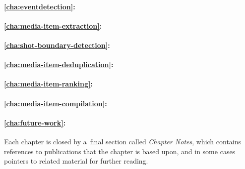\paragraph{\autoref{cha:eventdetection}:}
\paragraph{\autoref{cha:media-item-extraction}:}
\paragraph{\autoref{cha:shot-boundary-detection}:}
\paragraph{\autoref{cha:media-item-deduplication}:}
\paragraph{\autoref{cha:media-item-ranking}:}
\paragraph{\autoref{cha:media-item-compilation}:}
\paragraph{\autoref{cha:future-work}:}

Each chapter is closed by a~final section called
\emph{Chapter Notes}, which contains references to publications
that the chapter is based upon,
and in some cases pointers to related material for further reading.


\clearpage

